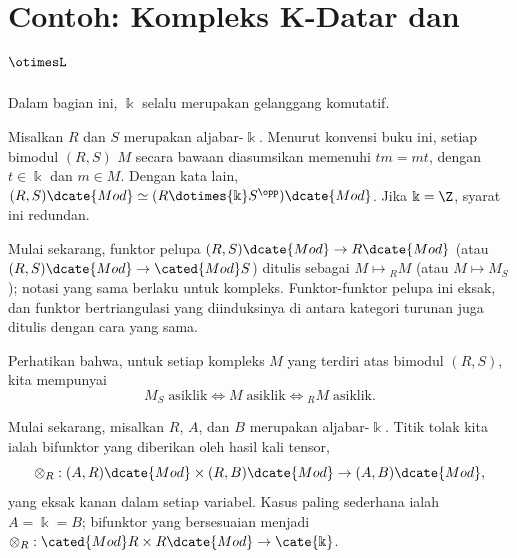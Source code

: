 
\section{Contoh: Kompleks K-Datar dan \texorpdfstring{$\otimesL$}{otimesL}}\label{sec:otimesL}
\hypertarget{o014.aljabr2.chapter4.k-flat-derived-tensor-a}{ }

Dalam bagian ini, $\Bbbk$ selalu merupakan gelanggang komutatif.

\begin{konvensi}\label{con:bimodule-algebra}
	Misalkan $R$ dan $S$ merupakan aljabar-$\Bbbk$. Menurut konvensi buku ini,
	setiap bimodul $(R,S)$ $M$ secara bawaan diasumsikan memenuhi $tm=mt$, dengan
	$t\in\Bbbk$ dan $m\in M$. Dengan kata lain,
	$(R,S)\dcate{Mod}\simeq(R\dotimes{\Bbbk}S^{\opp})\dcate{Mod}$. Jika
	$\Bbbk=\Z$, syarat ini redundan.

	Mulai sekarang, funktor pelupa
	$(R,S)\dcate{Mod}\to R\dcate{Mod}$ (atau
	$(R,S)\dcate{Mod}\to\cated{Mod}S$) ditulis sebagai
	$M\mapsto{}_RM$ (atau $M\mapsto M_S$); notasi yang sama berlaku untuk
	kompleks. Funktor-funktor pelupa ini eksak, dan funktor bertriangulasi yang
	diinduksinya di antara kategori turunan juga ditulis dengan cara yang sama.
\end{konvensi}

Perhatikan bahwa, untuk setiap kompleks $M$ yang terdiri atas
bimodul $(R,S)$, kita mempunyai
\[ M_S \;\text{asiklik} \iff M \;\text{asiklik} \iff {}_R M \;\text{asiklik}. \]

Mulai sekarang, misalkan $R$, $A$, dan $B$ merupakan aljabar-$\Bbbk$. Titik
tolak kita ialah bifunktor yang diberikan oleh hasil kali tensor,
\[ \otimes_R: (A, R)\dcate{Mod} \times (R, B)\dcate{Mod} \to (A, B)\dcate{Mod}, \]
yang eksak kanan dalam setiap variabel. Kasus paling sederhana ialah
$A=\Bbbk=B$; bifunktor yang bersesuaian menjadi
$\otimes_R:\cated{Mod}R\times R\dcate{Mod}\to\cate{\Bbbk}$.


